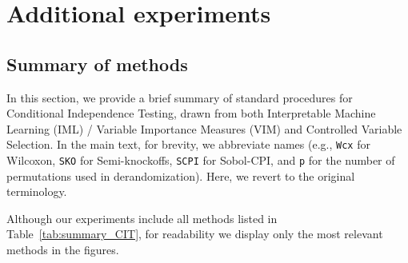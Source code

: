 \documentclass{article}
\theoremstyle{plain}
\theoremstyle{definition}
\theoremstyle{remark}
\begin{document}
\section{Additional experiments}\label{app:exps}

\subsection{Summary of methods}

In this section, we provide a brief summary of standard procedures for Conditional Independence Testing, drawn from both Interpretable Machine Learning (IML) / Variable Importance Measures (VIM) and Controlled Variable Selection. In the main text, for brevity, we abbreviate names (e.g., \texttt{Wcx} for Wilcoxon, \texttt{SKO} for Semi-knockoffs, \texttt{SCPI} for Sobol-CPI, and \texttt{p} for the number of permutations used in derandomization). Here, we revert to the original terminology. 

Although our experiments include all methods listed in Table~\ref{tab:summary_CIT}, for readability we display only the most relevant methods in the figures.
\end{document}
